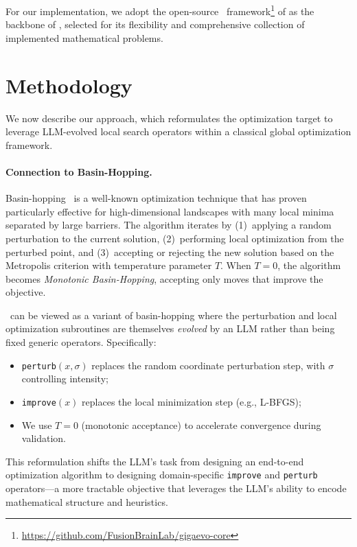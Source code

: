 \documentclass[sigconf]{acmart}
\begin{document}
For our implementation, we adopt the open-source \gigaevo\ framework\footnote{\url{https://github.com/FusionBrainLab/gigaevo-core}} of \citet{khrulkov2025gigaevo} as the backbone of \improvevolve, selected for its flexibility and comprehensive collection of implemented mathematical problems.


\section{Methodology}
We now describe our approach, which reformulates the optimization target to leverage LLM-evolved local search operators within a classical global optimization framework.

\paragraph{Connection to Basin-Hopping.}
Basin-hopping~\cite{wales1997basinhopping} is a well-known optimization technique that has proven particularly effective for high-dimensional landscapes with many local minima separated by large barriers. The algorithm iterates by (1)~applying a random perturbation to the current solution, (2)~performing local optimization from the perturbed point, and (3)~accepting or rejecting the new solution based on the Metropolis criterion with temperature parameter $T$. When $T = 0$, the algorithm becomes \emph{Monotonic Basin-Hopping}, accepting only moves that improve the objective.

\improvevolve\ can be viewed as a variant of basin-hopping where the perturbation and local optimization subroutines are themselves \emph{evolved} by an LLM rather than being fixed generic operators. Specifically:
\begin{itemize}
    \item \texttt{perturb}$(x, \sigma)$ replaces the random coordinate perturbation step, with $\sigma$ controlling intensity;
    \item \texttt{improve}$(x)$ replaces the local minimization step (e.g., L-BFGS);
    \item We use $T = 0$ (monotonic acceptance) to accelerate convergence during validation.
\end{itemize}
This reformulation shifts the LLM's task from designing an end-to-end optimization algorithm to designing domain-specific \texttt{improve} and \texttt{perturb} operators---a more tractable objective that leverages the LLM's ability to encode mathematical structure and heuristics.
\end{document}
